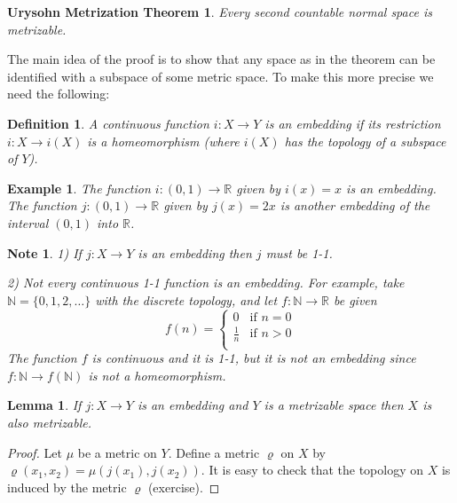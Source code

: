 \documentclass[11pt, letterpaper, oneside]{report}
\theoremstyle{pplain}
\newtheorem{lemma}[theorem]{Lemma}
\newtheorem{ITERMVALUE THM}[theorem]{Intermediate Value Theorem}
\newtheorem{HEINEBOREL THM}[theorem]{Heine-Borel Theorem}
\newtheorem{UMETR THM}[theorem]{Urysohn Metrization Theorem}
\newtheorem{UMETR2 THM}[theorem]{Urysohn Metrization Theorem (v.2)}
\theoremstyle{ddefinition}
\newtheorem{definition}[theorem]{Definition}
\newtheorem{example}[theorem]{Example}
\newtheorem{note}[theorem]{Note}
\theoremstyle{nnn}
\newtheorem{TDA NN}[theorem]{Topological Data Analysis. }
\theoremstyle{eexercise}
\newcommand{\N}{{\mathbb N}}
\newcommand{\R}{{\mathbb R}}
\begin{document}
\begin{UMETR THM}  
\label{NORMAL URYSOHN METR THM}
Every second countable normal space is metrizable.   
\end{UMETR THM}

The main idea of the proof is to show that any space as in the theorem can be identified 
with a subspace of some metric space. To make this more precise we need the following: 

\begin{definition}
\label{EMBEDDING DEF}
A continuous function $i\colon X\to Y$ is an \emph{embedding} if  its restriction 
$i\colon X \to i(X)$ is a homeomorphism (where $i(X)$ has the topology of a subspace of $Y$).  
\end{definition}

\begin{example}
The function $i\colon (0, 1) \to \R$ given by $i(x)= x$ is an embedding. The function 
$j\colon (0, 1) \to \R$ given by $j(x) = 2x$ is another embedding  of the interval 
$(0, 1)$ into $\R$.
\end{example}


\begin{note}
1) If $j\colon X\to Y$ is an embedding then $j$ must be 1-1. 

2) Not every continuous 1-1 function is an embedding. For example, take 
$\N = \{0, 1, 2, \dots\}$ with the discrete topology, and let 
$f\colon \N \to \R$ be given 
$$
f(n) = 
\begin{cases}
0 & \text{if $n = 0$} \\
\tfrac{1}{n} & \text{if $n >0$} \\
\end{cases}
$$
The function $f$ is  continuous and it is 1-1, but  it is not an embedding since 
$f\colon \N \to f(\N)$ is not a homeomorphism. 
\end{note}


\begin{lemma}
\label{EBM INTO METRIC LEMMA}
If $j\colon X\to Y$ is an embedding and $Y$ is a metrizable space then $X$ is also metrizable. 
\end{lemma}

\begin{proof}
Let $\mu$ be a metric on $Y$. Define a metric $\varrho$ on $X$ by 
$\varrho(x_{1}, x_{2}) = \mu(j(x_{1}), j(x_{2}))$. It is easy to check that the topology on 
$X$ is induced by the metric $\varrho$ (exercise).
\end{proof}
\end{document}
